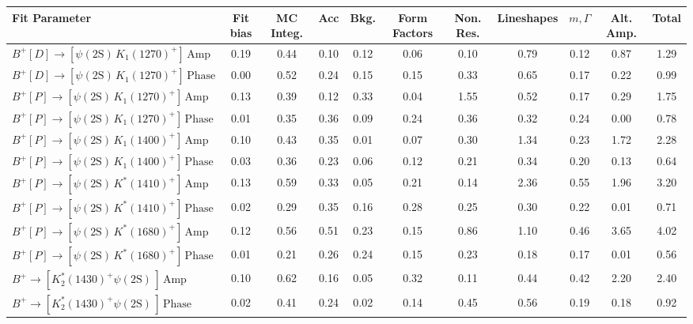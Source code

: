 \begin{tabular}{l  c  c  c  c  c  c  c  c  c  | c }
\hline
\hline
Fit Parameter & Fit bias & MC Integ. & Acc & Bkg. & Form Factors & Non. Res. & Lineshapes & $m,\Gamma$ & Alt. Amp. &  Total  \\ 
\hline
$B^{+}\left[D\right]\rightarrow \left[\psi(\text{2S})\,K_{1}(1270)^{+}\right]\,\text{Amp}$ & 0.19 & 0.44 & 0.10 & 0.12 & 0.06 & 0.10 & 0.79 & 0.12 & 0.87 & 1.29 \\ 
$B^{+}\left[D\right]\rightarrow \left[\psi(\text{2S})\,K_{1}(1270)^{+}\right]\,\text{Phase}$ & 0.00 & 0.52 & 0.24 & 0.15 & 0.15 & 0.33 & 0.65 & 0.17 & 0.22 & 0.99 \\ 
$B^{+}\left[P\right]\rightarrow \left[\psi(\text{2S})\,K_{1}(1270)^{+}\right]\,\text{Amp}$ & 0.13 & 0.39 & 0.12 & 0.33 & 0.04 & 1.55 & 0.52 & 0.17 & 0.29 & 1.75 \\ 
$B^{+}\left[P\right]\rightarrow \left[\psi(\text{2S})\,K_{1}(1270)^{+}\right]\,\text{Phase}$ & 0.01 & 0.35 & 0.36 & 0.09 & 0.24 & 0.36 & 0.32 & 0.24 & 0.00 & 0.78 \\ 
$B^{+}\left[P\right]\rightarrow \left[\psi(\text{2S})\,K_{1}(1400)^{+}\right]\,\text{Amp}$ & 0.10 & 0.43 & 0.35 & 0.01 & 0.07 & 0.30 & 1.34 & 0.23 & 1.72 & 2.28 \\ 
$B^{+}\left[P\right]\rightarrow \left[\psi(\text{2S})\,K_{1}(1400)^{+}\right]\,\text{Phase}$ & 0.03 & 0.36 & 0.23 & 0.06 & 0.12 & 0.21 & 0.34 & 0.20 & 0.13 & 0.64 \\ 
$B^{+}\left[P\right]\rightarrow \left[\psi(\text{2S})\,K^{*}(1410)^{+}\right]\,\text{Amp}$ & 0.13 & 0.59 & 0.33 & 0.05 & 0.21 & 0.14 & 2.36 & 0.55 & 1.96 & 3.20 \\ 
$B^{+}\left[P\right]\rightarrow \left[\psi(\text{2S})\,K^{*}(1410)^{+}\right]\,\text{Phase}$ & 0.02 & 0.29 & 0.35 & 0.16 & 0.28 & 0.25 & 0.30 & 0.22 & 0.01 & 0.71 \\ 
$B^{+}\left[P\right]\rightarrow \left[\psi(\text{2S})\,K^{*}(1680)^{+}\right]\,\text{Amp}$ & 0.12 & 0.56 & 0.51 & 0.23 & 0.15 & 0.86 & 1.10 & 0.46 & 3.65 & 4.02 \\ 
$B^{+}\left[P\right]\rightarrow \left[\psi(\text{2S})\,K^{*}(1680)^{+}\right]\,\text{Phase}$ & 0.01 & 0.21 & 0.26 & 0.24 & 0.15 & 0.23 & 0.18 & 0.17 & 0.01 & 0.56 \\ 
$B^{+}\rightarrow \left[K_{2}^{*}(1430)^{+}\psi(\text{2S})\,\right]\,\text{Amp}$ & 0.10 & 0.62 & 0.16 & 0.05 & 0.32 & 0.11 & 0.44 & 0.42 & 2.20 & 2.40 \\ 
$B^{+}\rightarrow \left[K_{2}^{*}(1430)^{+}\psi(\text{2S})\,\right]\,\text{Phase}$ & 0.02 & 0.41 & 0.24 & 0.02 & 0.14 & 0.45 & 0.56 & 0.19 & 0.18 & 0.92 \\ 

\end{tabular}
